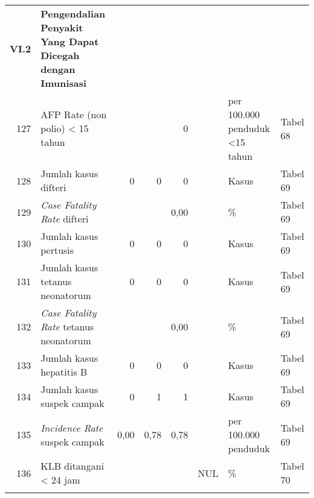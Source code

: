 \begin{small}
\begin{longtable}{rY{12em}rrrrY{5em}Y{5em}}
	\textbf{VI.2} & \textbf{Pengendalian Penyakit Yang Dapat Dicegah dengan Imunisasi}&        &        &                    &          &                                &          \\
	127 & AFP Rate (non polio) < 15 tahun                                             &        &        &                  0 &          & per 100.000 penduduk <15 tahun & Tabel 68 \\
	128 & Jumlah kasus difteri                                                        &      0 &      0 &                  0 &          & Kasus                          & Tabel 69 \\
	129 & \emph{Case Fatality Rate} difteri                                           &        &        &               0,00 &          & \%                             & Tabel 69 \\
	130 & Jumlah kasus pertusis                                                       &      0 &      0 &                  0 &          & Kasus                          & Tabel 69 \\
	131 & Jumlah kasus tetanus neonatorum                                             &      0 &      0 &                  0 &          & Kasus                          & Tabel 69 \\
	132 & \emph{Case Fatality Rate} tetanus neonatorum                                &        &        &               0,00 &          & \%                             & Tabel 69 \\
	133 & Jumlah kasus hepatitis B                                                    &      0 &      0 &                  0 &          & Kasus                          & Tabel 69 \\
	134 & Jumlah kasus suspek campak                                                  &      0 &      1 &                  1 &          & Kasus                          & Tabel 69 \\
	135 & \emph{Incidence Rate} suspek campak                                         &   0,00 &   0,78 &               0,78 &          & per 100.000 penduduk           & Tabel 69 \\
	136 & KLB ditangani < 24 jam                                                      &        &        &                    &      NUL & \%                             & Tabel 70 \\
	&                                                                                 &        &        &                    &          &                                &          \\

\end{longtable}
\end{small}
